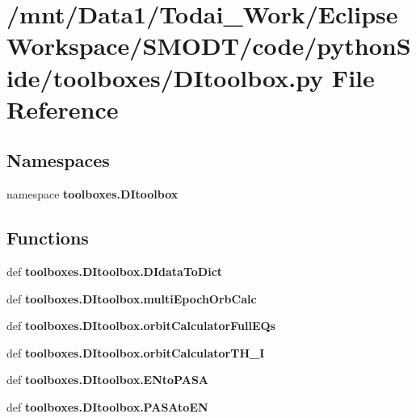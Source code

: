\section{/mnt/\-Data1/\-Todai\-\_\-\-Work/\-Eclipse\-Workspace/\-S\-M\-O\-D\-T/code/python\-Side/toolboxes/\-D\-Itoolbox.py File Reference}
\label{_d_itoolbox_8py}
\subsection*{Namespaces}
\begin{DoxyCompactItemize}
\item 
namespace {\bf toolboxes.\-D\-Itoolbox}
\end{DoxyCompactItemize}
\subsection*{Functions}
\begin{DoxyCompactItemize}
\item 
def {\bf toolboxes.\-D\-Itoolbox.\-D\-Idata\-To\-Dict}
\item 
def {\bf toolboxes.\-D\-Itoolbox.\-multi\-Epoch\-Orb\-Calc}
\item 
def {\bf toolboxes.\-D\-Itoolbox.\-orbit\-Calculator\-Full\-E\-Qs}
\item 
def {\bf toolboxes.\-D\-Itoolbox.\-orbit\-Calculator\-T\-H\-\_\-\-I}
\item 
def {\bf toolboxes.\-D\-Itoolbox.\-E\-Nto\-P\-A\-S\-A}
\item 
def {\bf toolboxes.\-D\-Itoolbox.\-P\-A\-S\-Ato\-E\-N}
\end{DoxyCompactItemize}
